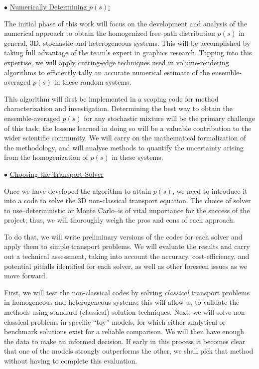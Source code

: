 \documentclass[12pt]{article}
\begin{document}
$\bullet$ \underline{Numerically Determining $p(s)$:}

The initial phase of this work will focus on the development and analysis of the numerical approach to obtain the homogenized free-path distribution $p(s)$ in general, 3D, stochastic and heterogeneous systems.
This will be accomplished by taking full advantage of the team's expert in graphics research.
Tapping into this expertise, we will apply cutting-edge techniques used in volume-rendering algorithms to efficiently tally an accurate numerical estimate of the ensemble-averaged $p(s)$ in these random systems.

This algorithm will first be implemented in a scoping code for method characterization and investigation.
Determining the best way to obtain the ensemble-averaged $p(s)$ for any stochastic mixture will be the primary challenge of this task; the lessons learned in doing so will be a valuable contribution to the wider scientific community.
We will carry on the mathematical formalization of the methodology, and will analyse methods to quantify the uncertainty arising from the homogenization of $p(s)$ in these systems.

$\bullet$ \underline{Choosing the Transport Solver}

Once we have developed the algorithm to attain $p(s)$, we need to introduce it into a code to solve the 3D non-classical transport equation.
The choice of solver to use--deterministic or Monte Carlo--is of vital importance for the success of the project; thus, we will thoroughly weigh the pros and cons of each approach.

To do that, we will write preliminary versions of the codes for each solver and apply them to simple transport problems.
We will evaluate the results and carry out a technical assessment, taking into account the accuracy, cost-efficiency, and potential pitfalls identified for each solver, as well as other foreseen issues as we move forward.

First, we will test the non-classical codes by solving \textit{classical} transport problems in homogeneous and heterogeneous systems; this will allow us to validate the methods using standard (classical) solution techniques.
Next, we will solve non-classical problems in specific ``toy'' models, for which either analytical or benchmark solutions exist for a reliable comparison.
We will then have enough the data to make an informed decision.
If early in this process it becomes clear that one of the models strongly outperforms the other, we shall pick that method without having to complete this evaluation.
\end{document}
